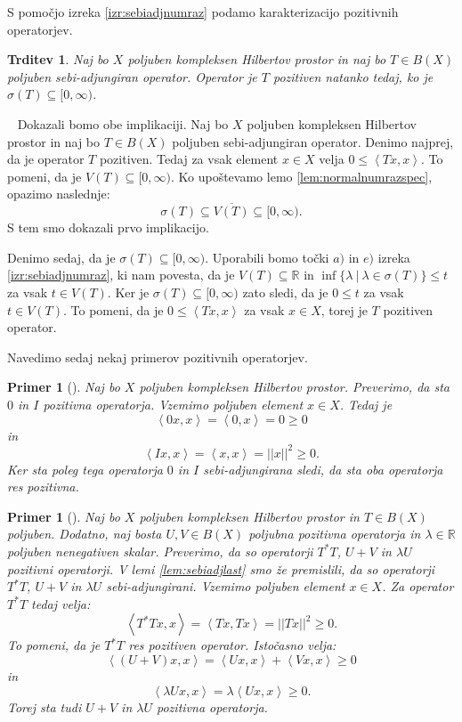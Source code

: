 \documentclass[12pt,a4paper,oneside,fleqn,openany]{book}
\newtheorem{trditev}[izrek]{Trditev}
\newtheorem{primer*}[izrek]{Primer}
\newcommand{\eopf}{\raisebox{0.8ex}{\framebox{}}} %
\newenvironment{dokaz}%
{\noindent{\bf Dokaz.}\ }%
{\hfill\eopf\par\bigskip}%
\newenvironment{primer}[1][]{\begin{primer*}[#1]\renewcommand*{\qedsymbol}{$\diamondsuit$}\pushQED{\qed}}{\popQED\end{primer*}}
\newcommand{\R}{\mathbb{R}}
\newcommand{\abs}[1]{\ensuremath{\lvert #1 \rvert}}
\newcommand{\norm}[1]{\abs{\abs{#1}}}
\newcommand{\Sp}[2]{\ensuremath{\left<#1, #2\right>}}
\begin{document}
S pomočjo izreka \ref{izr:sebiadjnumraz} podamo karakterizacijo pozitivnih operatorjev.

\begin{trditev}
	\label{trd:pozopkar}
	Naj bo $X$ poljuben kompleksen Hilbertov prostor in naj bo $T\in B(X)$ poljuben sebi-adjungiran operator. Operator je $T$ pozitiven natanko tedaj, ko je $\sigma(T)\subseteq [0, \infty)$.
\end{trditev}

\begin{dokaz}
	Dokazali bomo obe implikaciji. 
	Naj bo $X$ poljuben kompleksen Hilbertov prostor in naj bo $T\in B(X)$ poljuben sebi-adjungiran operator. Denimo najprej, da je operator $T$ pozitiven. Tedaj za vsak element $x\in X$ velja $0\leq\Sp{Tx}{x}$. To pomeni, da je $V(T)\subseteq [0, \infty)$. Ko upoštevamo lemo \ref{lem:normalnumrazspec}, opazimo naslednje: $$\sigma(T)\subseteq\overline{V(T)}\subseteq [0, \infty).$$ S tem smo dokazali prvo implikacijo.
	
	Denimo sedaj, da je $\sigma(T)\subseteq [0, \infty)$. Uporabili bomo točki $a)$ in $e)$ izreka \ref{izr:sebiadjnumraz}, ki nam povesta, da je $V(T)\subseteq\R$ in $\inf\{\lambda~|~\lambda\in\sigma(T)\} \leq t$ za vsak $t\in V(T)$. Ker je $\sigma(T)\subseteq [0, \infty)$ zato sledi, da je $0 \leq t$ za vsak $t\in V(T)$. To pomeni, da je $0\leq\Sp{Tx}{x}$ za vsak $x\in X$, torej je $T$ pozitiven operator.
\end{dokaz}

Navedimo sedaj nekaj primerov pozitivnih operatorjev.

\begin{primer}
	\label{prim:pozoptriv}
	Naj bo $X$ poljuben kompleksen Hilbertov prostor. Preverimo, da sta $0$ in $I$ pozitivna operatorja. Vzemimo poljuben element $x\in X$. Tedaj je $$\Sp{0x}{x} = \Sp{0}{x} = 0 \geq 0$$ in $$\Sp{Ix}{x} = \Sp{x}{x} = \norm{x}^2 \geq 0.$$ Ker sta poleg tega operatorja $0$ in $I$ sebi-adjungirana sledi, da sta oba operatorja res pozitivna.
\end{primer}

\begin{primer}
	\label{prim:pozoptriv}
	Naj bo $X$ poljuben kompleksen Hilbertov prostor in $T\in B(X)$ poljuben. Dodatno, naj bosta $U, V\in B(X)$ poljubna pozitivna operatorja in $\lambda\in \R$ poljuben nenegativen skalar. Preverimo, da so operatorji $T^*T$, $U+V$ in $\lambda U$ pozitivni operatorji. 
	V lemi \ref{lem:sebiadjlast} smo že premislili, da so operatorji $T^*T$, $U+V$ in $\lambda U$ sebi-adjungirani. Vzemimo poljuben element $x\in X$. 
	Za operator $T^*T$ tedaj velja: $$\Sp{T^*Tx}{x} = \Sp{Tx}{Tx} = \norm{Tx}^2 \geq 0.$$ To pomeni, da je $T^*T$ res pozitiven operator.
	Istočasno velja: $$\Sp{(U+V)x}{x} = \Sp{Ux}{x} + \Sp{Vx}{x} \geq 0$$
	in $$\Sp{\lambda Ux}{x} = \lambda\Sp{Ux}{x} \geq 0.$$
	Torej sta tudi $U+V$ in $\lambda U$ pozitivna operatorja.	
\end{primer}
\end{document}
